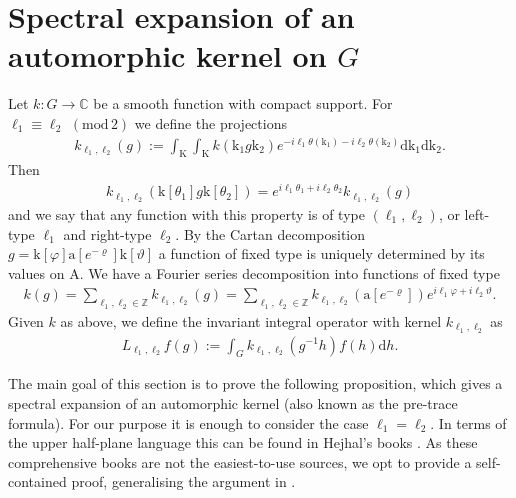 \documentclass[12pt]{amsart}
\theoremstyle{definition}
\theoremstyle{remark}
\numberwithin{equation}{section}
\newcommand{\C}{{\mathbb C}}
\newcommand{\Z}{{\mathbb Z}}
\newcommand{\1}{{\mathbf 1}}
\renewcommand{\d}{\mathrm d}
\renewcommand{\pmod}[1]{\,\,(\mathrm{mod}\,{#1})}
\begin{document}
\section{Spectral expansion of an automorphic kernel on $G$}\label{sec:specexpauto}
Let $k:G \to \C$ be a smooth function with compact support. For $\ell_1 \equiv \ell_2 \pmod{2}$ we define the projections
\begin{align}\label{eq:projectionll}
    k_{\ell_1,\ell_2}(g) :=  \int_\mathrm{K} \int_\mathrm{K} k( \mathrm{k_1} g \mathrm{k_2}) e^{-i\ell_1 \theta(\mathrm{k_1})-i\ell_2 \theta(\mathrm{k_2})} \d \mathrm{k}_1 \d \mathrm{k}_2.
\end{align}
Then
\begin{align*}
    k_{\ell_1,\ell_2}(\mathrm{k}[\theta_1] g\mathrm{k}[\theta_2]) =     e^{i\ell_1 \theta_1+i\ell_2 \theta_2}k_{\ell_1,\ell_2}(g) 
\end{align*}
and we say that any function with this property is of type $(\ell_1,\ell_2)$, or left-type $\ell_1$ and right-type $\ell_2$. By the Cartan decomposition $g=\mathrm{k}[\varphi] \mathrm{a}[e^{-\varrho}]\mathrm{k}[\vartheta]$ a function of fixed type is uniquely determined by its values on $\mathrm{A}$. We have a Fourier series decomposition into functions of fixed type
\begin{align*}
    k(g) = \sum_{\ell_1,\ell_2 \in \Z}  k_{\ell_1,\ell_2}(g) = \sum_{\ell_1,\ell_2 \in \Z}  k_{\ell_1,\ell_2}(\mathrm{a}[e^{-\varrho}]) e^{i\ell_1 \varphi+i\ell_2 \vartheta}.
\end{align*}
Given $k$ as above, we define the invariant integral operator with kernel $k_{\ell_1,\ell_2}$ as
\begin{align*}
    L_{\ell_1,\ell_2} f (g):= \int_G k_{\ell_1,\ell_2}(g^{-1} h ) f(h) \d h.
\end{align*}



The main goal of this section is to prove the following proposition, which gives a spectral expansion of an automorphic kernel (also known as the pre-trace formula). For our purpose it is enough to consider the case $\ell_1=\ell_2$. In terms of the upper half-plane language this can be found in Hejhal's books \cite{Hejhal1,Hejhal2}. As these comprehensive books are not the easiest-to-use sources, we opt to provide a self-contained proof, generalising the argument in \cite[Chapter 1.8]{IwaniecBook}.
\end{document}
